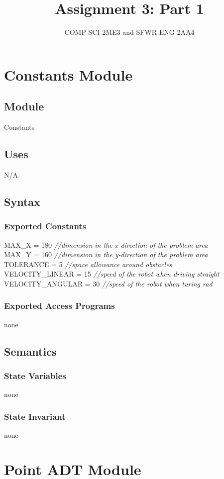 \documentclass[12pt]{article}
\title{Assignment 3: Part 1}
\author{COMP SCI 2ME3 and SFWR ENG 2AA4}
\begin{document}
\maketitle
\newpage


\section* {Constants Module}
\subsection*{Module}
Constants
\subsection* {Uses}
N/A
\subsection* {Syntax}
\subsubsection* {Exported Constants}
MAX\_X = 180 {\it //dimension in the x-direction of the problem area}\\
MAX\_Y = 160 {\it //dimension in the y-direction of the problem area}\\ 
TOLERANCE = 5 {\it //space allowance around obstacles}\\
VELOCITY\_LINEAR = 15 {\it //speed of the robot when driving straight}\\
VELOCITY\_ANGULAR = 30 {\it //speed of the robot when turing rad}
\subsubsection* {Exported Access Programs}
none
\subsection* {Semantics}
\subsubsection* {State Variables}
none
\subsubsection* {State Invariant}
none
\newpage


\section* {Point ADT Module}
\end{document}
